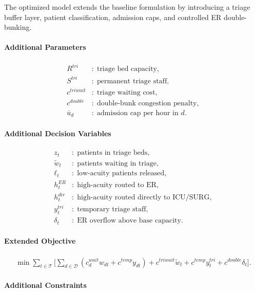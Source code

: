 \documentclass[11pt]{article}
\begin{document}
The optimized model extends the baseline formulation by introducing a triage buffer layer, patient classification, admission caps, and controlled ER double-bunking.

\paragraph{Additional Parameters}
\begin{align*}
R^{tri} &:\; \text{triage bed capacity}, \\
S^{tri} &:\; \text{permanent triage staff}, \\
c^{triwait} &:\; \text{triage waiting cost}, \\
c^{double} &:\; \text{double-bunk congestion penalty}, \\
\bar{u}_d &:\; \text{admission cap per hour in } d.
\end{align*}

\paragraph{Additional Decision Variables}
\begin{align*}
z_t &:\; \text{patients in triage beds}, \\
\tilde{w}_t &:\; \text{patients waiting in triage}, \\
\ell_t &:\; \text{low-acuity patients released}, \\
h_t^{ER} &:\; \text{high-acuity routed to ER}, \\
h_t^{dir} &:\; \text{high-acuity routed directly to ICU/SURG}, \\
y_t^{tri} &:\; \text{temporary triage staff}, \\
\delta_t &:\; \text{ER overflow above base capacity}.
\end{align*}

\paragraph{Extended Objective}
\begin{align}
\min \sum_{t \in \mathcal{T}} \Bigg[ \sum_{d \in \mathcal{D}} \left( c_d^{wait} w_{dt} + c^{temp} y_{dt} \right) + c^{triwait} \tilde{w}_t + c^{temp} y_t^{tri} + c^{double} \delta_t \Bigg].
\end{align}

\paragraph{Additional Constraints}
\end{document}
